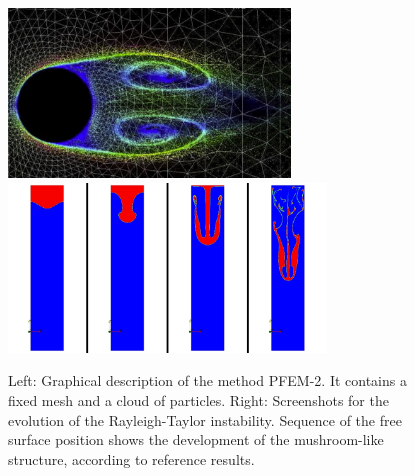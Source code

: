 \documentclass[onecolumn]{elsart3p}
\begin{document}
\begin{figure}[ht]
\centering
\includegraphics[height=4.5cm]{fixedMeshAndParticles.jpg}
\includegraphics[height=4.5cm]{sequence_rayleigh.jpg}
\caption{Left: Graphical description of the method PFEM-2. It contains a fixed mesh and a cloud of particles\cite{idelsohn_etal_13}.
Right: Screenshots for the evolution of the Rayleigh-Taylor instability. Sequence of the free surface position shows the development of the mushroom-like structure, according to reference results\cite{Strubelj2011}.}
\label{foto}
\end{figure}



\end{document}

